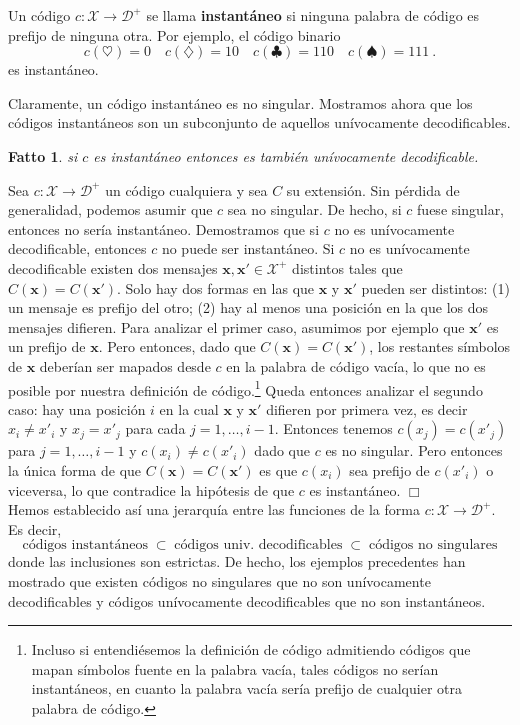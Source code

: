 \documentclass[11pt]{article}
\newtheorem{fact}[theorem]{Fatto}
\newenvironment{proof}{{\textsc{Dimostrazione.}\ }}{\hfill$\Box$\\[2mm]}
\newcommand{\bx}{ \boldsymbol{x} }
\newcommand{\scD}{\mathcal{D}}
\newcommand{\scX}{\mathcal{X}}
\begin{document}
Un código $c : \scX \to \scD^+$ se llama \textbf{instantáneo} si ninguna palabra de código es prefijo de ninguna otra. Por ejemplo, el código binario
\[
    c(\heartsuit) = 0 \quad c(\diamondsuit) = 10 \quad c(\clubsuit) = 110 \quad c(\spadesuit) = 111~.
\]
es instantáneo.

Claramente, un código instantáneo es no singular. Mostramos ahora que los códigos instantáneos son un subconjunto de aquellos unívocamente decodificables.
%
\begin{fact}
si $c$ es instantáneo entonces es también unívocamente decodificable.
\end{fact}
%
\begin{proof}
Sea $c : \scX\to\scD^+$ un código cualquiera y sea $C$ su extensión. Sin pérdida de generalidad, podemos asumir que $c$ sea no singular. De hecho, si $c$ fuese singular, entonces no sería instantáneo. Demostramos que si $c$ no es unívocamente decodificable, entonces $c$ no puede ser instantáneo. Si $c$ no es unívocamente decodificable existen dos mensajes $\bx,\bx'\in\scX^+$ distintos tales que $C(\bx) = C(\bx')$. Solo hay dos formas en las que $\bx$ y $\bx'$ pueden ser distintos: (1) un mensaje es prefijo del otro; (2) hay al menos una posición en la que los dos mensajes difieren. Para analizar el primer caso, asumimos por ejemplo que $\bx'$ es un prefijo de $\bx$. Pero entonces, dado que $C(\bx) = C(\bx')$, los restantes símbolos de $\bx$ deberían ser mapados desde $c$ en la palabra de código vacía, lo que no es posible por nuestra definición de código.\footnote{Incluso si entendiésemos la definición de código admitiendo códigos que mapan símbolos fuente en la palabra vacía, tales códigos no serían instantáneos, en cuanto la palabra vacía sería prefijo de cualquier otra palabra de código.} Queda entonces analizar el segundo caso: hay una posición $i$ en la cual $\bx$ y $\bx'$ difieren por primera vez, es decir $x_i \neq x'_i$ y $x_j = x'_j$ para cada $j = 1,\dots,i-1$. Entonces tenemos $c(x_j)=c(x'_j)$ para $j=1,\dots,i-1$ y $c(x_i) \neq c(x'_i)$ dado que $c$ es no singular. Pero entonces la única forma de que $C(\bx) = C(\bx')$ es que $c(x_i)$ sea prefijo de $c(x'_i)$ o viceversa, lo que contradice la hipótesis de que $c$ es instantáneo.
\end{proof}
%
Hemos establecido así una jerarquía entre las funciones de la forma $c:\scX\to\scD^+$. Es decir,
\[
    \text{códigos instantáneos} \;\subset\; \text{códigos univ.\ decodificables} \;\subset\; \text{códigos no singulares}
\]
donde las inclusiones son estrictas. De hecho, los ejemplos precedentes han mostrado que existen códigos no singulares que no son unívocamente decodificables y códigos unívocamente decodificables que no son instantáneos.
\end{document}
